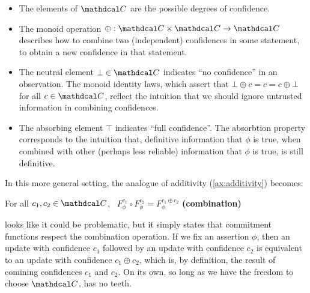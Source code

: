 \documentclass{article}
\def\cofunc{commitment function}
\def\confdom{\mathdcal C}
\begin{document}
\begin{itemize}%
	\item
	The elements of $\confdom$ are the possible degrees of confidence.

	\item
	The monoid operation $\oplus : \confdom \times \confdom \to \confdom$ describes how to combine two (independent) confidences in some statement, to obtain a new confidence in that statement.     

	\item The neutral element $\bot \in \confdom$ indicates ``no confidence'' in an observation.
	The monoid identity laws, which assert that
		$\bot \oplus c = c = c \oplus \bot$ for all $c \in \confdom$,
	reflect the intuition that we should ignore untrusted information in combining confidences.
	\item The absorbing element $\top$ indicates ``full confidence''.
	The absorbtion property corresponds to the intuition that, definitive information that $\phi$ is true, when combined with other (perhaps less reliable) information that $\phi$ is true, is still definitive.
\end{itemize}

In this more general setting, the analogue of additivity (\cref{ax:additivity}) becomes:
\begin{CFaxioms}
	\item For all $c_1, c_2 \in \confdom$,~
		$F^{c_1}_\phi \circ F^{c_2}_\phi = F^{c_1 \oplus c_2}_\phi$
		\hfill \textbf{(combination)} \label{ax:additivity}
\end{CFaxioms}
 looks like it could be problematic, but it simply states that \cofunc s respect the combination operation. 
If we fix an assertion $\phi$, then an update with confidence $c_1$ followed by an update with confidence $c_2$ is equivalent to an update with confidence $c_1 \oplus c_2$, which is, by definition, the result of comining confidences $c_1$ and $c_2$.
On its own, so long as we have the freedom to choose $\confdom$,  has no teeth. 
\end{document}
